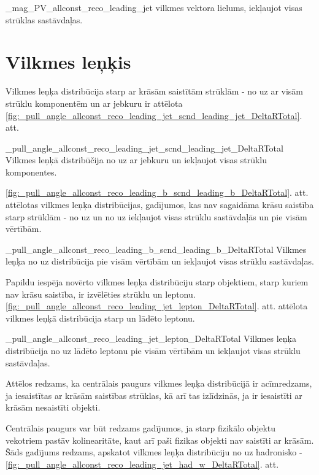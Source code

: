          {_mag_PV_allconst_reco_leading_jet}
          {\leadingjet vilkmes vektora lielums, iekļaujot visas strūklas sastāvdaļas.}

\section{Vilkmes leņķis}

Vilkmes leņķa distribūcija starp ar krāsām saistītām strūklām - no \leadingjet uz \scndleadingjet ar visām strūklu komponentēm un ar jebkuru \DeltaR ir attēlota \ref{fig:_pull_angle_allconst_reco_leading_jet_scnd_leading_jet_DeltaRTotal}. att.

          {_pull_angle_allconst_reco_leading_jet_scnd_leading_jet_DeltaRTotal}
          {Vilkmes leņķā distribūčija no \leadingjet uz \scndleadingjet ar jebkuru \DeltaR un iekļaujot visas strūklu komponentes.}


\ref{fig:_pull_angle_allconst_reco_leading_b_scnd_leading_b_DeltaRTotal}. att. attēlotas vilkmes leņķa distribūcijas, gadījumos, kas nav sagaidāma krāsu saistība starp strūklām - no \leadingb uz \scndleadingb un no \scndleadingb uz \leadingb iekļaujot visas strūklu sastāvdaļās un pie visām \DeltaR vērtībām.

          {_pull_angle_allconst_reco_leading_b_scnd_leading_b_DeltaRTotal}
          {Vilkmes leņķa no \leadingb uz \scndleadingb distribūcija pie visām \DeltaR vērtībām un iekļaujot visas strūklu sastāvdaļas.}

Papildu iespēja novērto vilkmes leņķa distribūciju starp objektiem, starp kuriem nav krāsu saistība, ir izvēlēties strūklu un leptonu. \ref{fig:_pull_angle_allconst_reco_leading_jet_lepton_DeltaRTotal}. att. attēlota vilkmes leņķā distribūcija starp \leadingjet un lādēto leptonu. 

          {_pull_angle_allconst_reco_leading_jet_lepton_DeltaRTotal}
          {Vilkmes leņķa distribūcija no \leadingjet uz lādēto leptonu pie visām \DeltaR vērtībām un iekļaujot visas strūklu sastāvdaļas.}

Attēlos redzams, ka centrālais paugurs vilkmes leņķa distribūcijā ir acīmredzams, ja iesaistītas ar krāsām saistības strūklas, kā arī tas izlīdzinās, ja ir iesaistīti ar krāsām nesaistīti objekti. 

Centrālais paugurs var būt redzams gadījumos, ja starp fizikālo objektu vekotriem pastāv kolinearitāte, kaut arī paši fizikas objekti nav saistīti ar krāsām. Šāds gadījums redzams, apskatot vilkmes leņķa distribūciju no \leadingjet uz hadronisko \PW - \ref{fig:_pull_angle_allconst_reco_leading_jet_had_w_DeltaRTotal}. att. 

